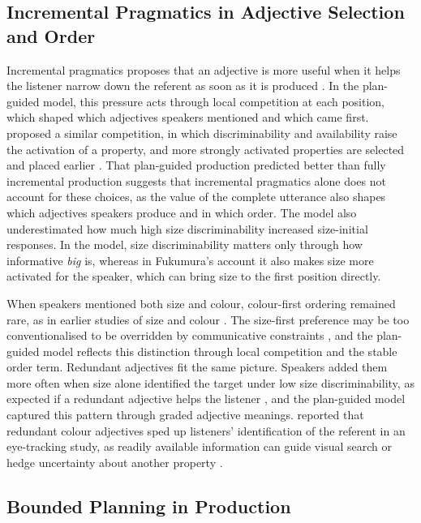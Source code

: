 \documentclass[10pt,a4paper,fleqn]{article}
\begin{document}
\subsection{Incremental Pragmatics in Adjective Selection and Order}

Incremental pragmatics proposes that an adjective is more useful when it helps the listener narrow down the referent as soon as it is produced \citep{fukumura2018ordering,rubio2021wordorder}.
In the plan-guided model, this pressure acts through local competition at each position, which shaped which adjectives speakers mentioned and which came first.
\citet{fukumura2018ordering} proposed a similar competition, in which discriminability and availability raise the activation of a property, and more strongly activated properties are selected and placed earlier \citep[p.~47]{fukumura2018ordering}.
That plan-guided production predicted better than fully incremental production suggests that incremental pragmatics alone does not account for these choices, as the value of the complete utterance also shapes which adjectives speakers produce and in which order.
The model also underestimated how much high size discriminability increased size-initial responses.
In the model, size discriminability matters only through how informative \emph{big} is, whereas in Fukumura's account it also makes size more activated for the speaker, which can bring size to the first position directly.

When speakers mentioned both size and colour, colour-first ordering remained rare, as in earlier studies of size and colour \citep{danks1972prenominal}.
The size-first preference may be too conventionalised to be overridden by communicative constraints \citep[p.~38]{fukumura2018ordering}, and the plan-guided model reflects this distinction through local competition and the stable order term.
Redundant adjectives fit the same picture.
Speakers added them more often when size alone identified the target under low size discriminability, as expected if a redundant adjective helps the listener \citep{rubio2016redundant,degen2020redundancy}, and the plan-guided model captured this pattern through graded adjective meanings.
\citet[p.~4]{rubio2016redundant} reported that redundant colour adjectives sped up listeners' identification of the referent in an eye-tracking study, as readily available information can guide visual search or hedge uncertainty about another property \citep{rubio2019overinformative,tourtouri2021rational}.

\subsection{Bounded Planning in Production}
\end{document}
